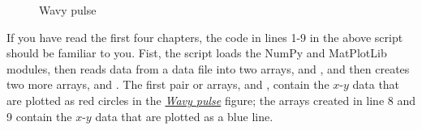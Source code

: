 \documentclass[letterpaper,10pt,english]{sphinxmanual}
\begin{document}
\begin{figure}[htbp]
\centering
\capstart

\caption{Wavy pulse}\label{chap5/chap5_plot:fig-wavypulse}\end{figure}

If you have read the first four chapters, the code in lines 1-9 in the above script should  be familiar to you.  Fist, the script loads the NumPy and MatPlotLib modules, then reads data from a data file into two arrays,  and , and then creates two more arrays,  and .  The first pair or arrays,  and , contain the $x$-$y$ data that are plotted as red circles in the {\hyperref[chap5/chap5_plot:fig-wavypulse]{\emph{Wavy pulse}}} figure; the arrays created in line 8 and 9 contain the $x$-$y$ data that are plotted as a blue line.
\end{document}
